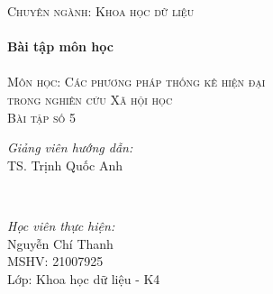 \documentclass[14pt, a4paper]{article}
\theoremstyle{sltheorem}
\theoremstyle{soltheorem}
\begin{document}
\begin{titlepage}
    \textsc{\Large Chuyên ngành: Khoa học dữ liệu}\\[0.5cm] %



    \HRule \\[0.4cm]
    { \huge \bfseries Bài tập môn học}\\[0.4cm] %
    \HRule \\[1.5cm]

    \textsc{\Large Môn học: Các phương pháp thống kê hiện đại \\ trong nghiên cứu Xã hội học}\\[1cm] %


    \textsc{\Large Bài tập số 5}\\[1cm]


    \begin{minipage}{0.4\textwidth}
        \begin{flushleft} \large
        \emph{Giảng viên hướng dẫn:} \\
        TS. Trịnh Quốc Anh %
        \end{flushleft}
    \end{minipage}\\[0.5cm]

    \begin{minipage}{0.4\textwidth}
    \begin{flushleft} \large
    \emph{Học viên thực hiện:}\\
    Nguyễn Chí Thanh \\
    MSHV: 21007925 \\ %
    Lớp: Khoa học dữ liệu - K4
    \end{flushleft}
    \end{minipage}




\end{titlepage}
\end{document}
